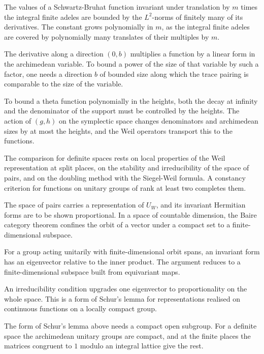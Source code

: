 The values of a Schwartz-Bruhat function invariant under translation by $m$
times the integral finite adeles are bounded by the $L^2$-norms of finitely
many of its derivatives. The constant grows polynomially in $m$, as the
integral finite adeles are covered by polynomially many translates of their
multiples by $m$.

The derivative along a direction $(0,b)$ multiplies a function by a linear
form in the archimedean variable. To bound a power of the size of that
variable by such a factor, one needs a direction $b$ of bounded size along
which the trace pairing is comparable to the size of the variable.

To bound a theta function polynomially in the heights, both the decay at
infinity and the denominator of the support must be controlled by the heights.
The action of $(g,h)$ on the symplectic space changes denominators and
archimedean sizes by at most the heights, and the Weil operators transport
this to the functions.

The comparison for definite spaces rests on local properties of the Weil
representation at split places, on the stability and irreducibility of the
space of pairs, and on the doubling method with the Siegel-Weil formula. A
constancy criterion for functions on unitary groups of rank at least two
completes them.

The space of pairs carries a representation of $U_W$, and its invariant
Hermitian forms are to be shown proportional. In a space of countable
dimension, the Baire category theorem confines the orbit of a vector under a
compact set to a finite-dimensional subspace.

For a group acting unitarily with finite-dimensional orbit spans, an invariant
form has an eigenvector relative to the inner product. The argument reduces to
a finite-dimensional subspace built from equivariant maps.

An irreducibility condition upgrades one eigenvector to proportionality on the
whole space. This is a form of Schur's lemma for representations realised on
continuous functions on a locally compact group.

The form of Schur's lemma above needs a compact open subgroup. For a definite
space the archimedean unitary groups are compact, and at the finite places the
matrices congruent to $1$ modulo an integral lattice give the rest.

